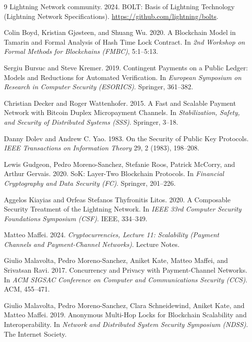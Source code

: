\documentclass[sigconf,review]{acmart}
\theoremstyle{acmdefinition}
\begin{document}
\begin{thebibliography}{9}
Lightning Network community.
2024.
BOLT: Basis of Lightning Technology (Lightning Network Specifications).
\url{https://github.com/lightning/bolts}.

Colin Boyd, Kristian Gjøsteen, and Shuang Wu.
2020.
A Blockchain Model in Tamarin and Formal Analysis of Hash Time Lock Contract.
In \emph{2nd Workshop on Formal Methods for Blockchains (FMBC)}, 5:1--5:13.

Sergiu Bursuc and Steve Kremer.
2019.
Contingent Payments on a Public Ledger: Models and Reductions for Automated Verification.
In \emph{European Symposium on Research in Computer Security (ESORICS)}. Springer, 361--382.

Christian Decker and Roger Wattenhofer.
2015.
A Fast and Scalable Payment Network with Bitcoin Duplex Micropayment Channels.
In \emph{Stabilization, Safety, and Security of Distributed Systems (SSS)}. Springer, 3--18.

Danny Dolev and Andrew C. Yao.
1983.
On the Security of Public Key Protocols.
\emph{IEEE Transactions on Information Theory} 29, 2 (1983), 198--208.

Lewis Gudgeon, Pedro Moreno-Sanchez, Stefanie Roos, Patrick McCorry, and Arthur Gervais.
2020.
SoK: Layer-Two Blockchain Protocols.
In \emph{Financial Cryptography and Data Security (FC)}. Springer, 201--226.

Aggelos Kiayias and Orfeas Stefanos Thyfronitis Litos.
2020.
A Composable Security Treatment of the Lightning Network.
In \emph{IEEE 33rd Computer Security Foundations Symposium (CSF)}. IEEE, 334--349.

Matteo Maffei.
2024.
\emph{Cryptocurrencies, Lecture 11: Scalability (Payment Channels and Payment-Channel Networks)}. Lecture Notes.

Giulio Malavolta, Pedro Moreno-Sanchez, Aniket Kate, Matteo Maffei, and Srivatsan Ravi.
2017.
Concurrency and Privacy with Payment-Channel Networks.
In \emph{ACM SIGSAC Conference on Computer and Communications Security (CCS)}. ACM, 455--471.

Giulio Malavolta, Pedro Moreno-Sanchez, Clara Schneidewind, Aniket Kate, and Matteo Maffei.
2019.
Anonymous Multi-Hop Locks for Blockchain Scalability and Interoperability.
In \emph{Network and Distributed System Security Symposium (NDSS)}. The Internet Society.


\end{thebibliography}
\end{document}
